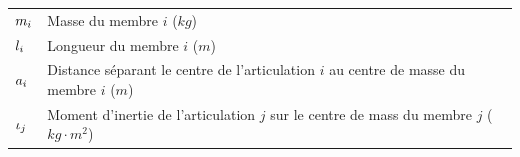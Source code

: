\documentclass[pdftex,a4paper,11pt]{article}
\begin{document}
%
%
%
%
%
%
%


\begin{tabular}{ll}
  $m_i$   & Masse du membre $i$ ($kg$) \\
  $l_i$ & Longueur du membre $i$ ($m$) \\
  $a_i$ & Distance séparant le centre de l'articulation $i$ au centre de masse du membre $i$ ($m$) \\
  $\iota_j$  & Moment d'inertie de l'articulation $j$ sur le centre de mass du membre $j$ ($kg \cdot m^2$) \\
\end{tabular}
\end{document}
